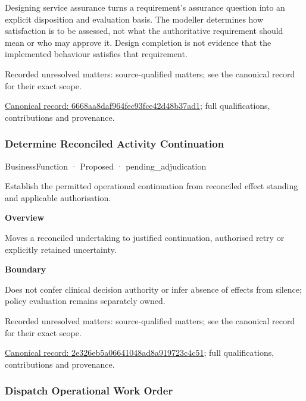 Designing service assurance turns a requirement's assurance question into an explicit disposition and evaluation basis. The modeller determines how satisfaction is to be assessed, not what the authoritative requirement should mean or who may approve it. Design completion is not evidence that the implemented behaviour satisfies that requirement.


{\small Recorded unresolved matters: source-qualified matters; see the canonical record for their exact scope.}\par
{\footnotesize \href{../../../../continuum/business/business-function/6668aa8daf964fec93fce42d48b37ad1.md}{Canonical record: 6668aa8daf964fec93fce42d48b37ad1}; full qualifications, contributions and provenance.}\par
\subsubsection{Determine Reconciled Activity Continuation}

\label{element:2e326eb5a06641048ad8a919723c4c51}
{\small BusinessFunction · Proposed · pending\_adjudication}\par

Establish the permitted operational continuation from reconciled effect standing and applicable authorisation.



\textbf{Overview}



Moves a reconciled undertaking to justified continuation, authorised retry or explicitly retained uncertainty.



\textbf{Boundary}



Does not confer clinical decision authority or infer absence of effects from silence; policy evaluation remains separately owned.


{\small Recorded unresolved matters: source-qualified matters; see the canonical record for their exact scope.}\par
{\footnotesize \href{../../../../continuum/business/business-function/2e326eb5a06641048ad8a919723c4c51.md}{Canonical record: 2e326eb5a06641048ad8a919723c4c51}; full qualifications, contributions and provenance.}\par
\subsubsection{Dispatch Operational Work Order}

